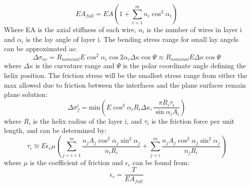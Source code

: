\begin{equation}
    EA_{full}=EA \left( 1+\sum_{i=1}^m n_i \cos^3\alpha_i \right)
\end{equation}
\noindent Where EA is the axial stiffness of each wire, $n_i$ is the number of wires in layer i and $\alpha_i$ is the lay angle of layer i. \newline
\newline
The bending stress range for small lay angels can be approximated as:
\begin{equation}
    \Delta \sigma_{nc} = R_{nominal} E \cos^2 \alpha_i \cos2 \alpha_i \Delta \kappa \cos \Psi \approx R_{nominal}E \Delta \kappa \cos \Psi
\end{equation}
where $\Delta \kappa$ is the curvature range and $\Psi$ is the polar coordinate angle defining the helix position. \newline
\newline
The friction stress will be the smallest stress range from either the max allowed due to friction between the interfaces and the plane surfaces remain plane solution:
\begin{equation}
    \Delta \sigma_f^i =\text{min}\left(E \cos^2 \alpha_i R_i \Delta \kappa , \frac{\pi R_i \tau_i}{\sin \alpha_i A_i}\right)
\end{equation}
where $R_i$ is the helix radius of the layer i, and $\tau_i$ is the friction force per unit length, and can be determined by:
\begin{equation}
    \tau_i \cong E \epsilon_c \mu \left( \sum_{j=i+1}^m \frac{n_j A_j \cos^2 \alpha_j \sin^2 \alpha_j }{n_i R_i} + \sum_{j=i}^m \frac{n_j A_j \cos^2 \alpha_j  \sin^2 \alpha_j}{n_j R_i}\right)
\end{equation}
where $\mu$ is the coefficient of friction and $\epsilon_c$ can be found from:
\begin{equation}
    \epsilon_c =\frac{T}{EA_{full}}
    \label{eq:stressvariation2}
\end{equation}
